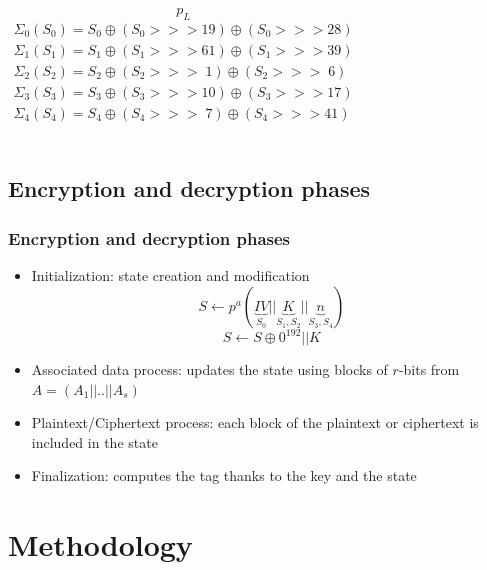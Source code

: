 \documentclass{beamer}
\begin{document}
\begin{frame}
\begin{columns}[T]
			$$p_L$$
			\tiny
			\begin{gather*}
				\Sigma_0(S_0) = S_0 \oplus (S_0 >>> 19) \oplus (S_0 >>> 28)\\
				\Sigma_1(S_1) = S_1 \oplus (S_1 >>> 61) \oplus (S_1 >>> 39)\\
				\Sigma_2(S_2) = S_2 \oplus (S_2 >>> \;  1) \oplus (S_2 >>> \; 6)\\
				\Sigma_3(S_3) = S_3 \oplus (S_3 >>> 10) \oplus (S_3 >>> 17)\\
				\Sigma_4(S_4) = S_4 \oplus (S_4 >>> \; 7) \oplus (S_4 >>> 41)\\
			\end{gather*}
		\end{columns}
	\end{frame}
	
	\subsection{Encryption and decryption phases}
	\begin{frame}
		\frametitle{Encryption and decryption phases}	
		\begin{itemize}
			\item Initialization: state creation and modification
			$$S \leftarrow p^{a}( \underbrace{IV}_{S_0}||\underbrace{K}_{S_1,S_2}||\underbrace{n}_{S_3,S_4})$$
			$$S \leftarrow S \oplus 0^{192} || K$$
			\item Associated data process: updates the state using blocks of $r$-bits from $A=(A_1||..||A_s)$
			\item Plaintext/Ciphertext process: each block of the plaintext or ciphertext is included in the state
			\item Finalization: computes the tag thanks to the key and the state
		\end{itemize}	
	\end{frame}

	
	\section{Methodology}
\end{document}
